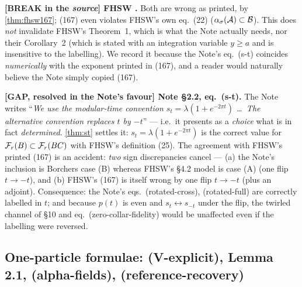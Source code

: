 \documentclass[11pt]{article}
\renewcommand{\cB}{\mathcal B}
\begin{document}
\begin{verdictbreak}
\textbf{[BREAK in the \emph{source}] FHSW \cite[\S4.2, eq.~(167) and the
definition sentence]{FHSW}.} Both are wrong as printed, by
\cref{thm:fhsw167}; (167) even violates FHSW's own eq.~(22)
($\alpha_\sigma(\cA)\subset\cB$). This does \emph{not} invalidate FHSW's
Theorem~1, which is what the Note actually needs, nor their Corollary~2 (which
is stated with an integration variable $y\ge a$ and is insensitive to the
labelling). We record it because the Note's eq.~(s-t) coincides
\emph{numerically} with the exponent printed in (167), and a reader would
naturally believe the Note simply copied (167).
\end{verdictbreak}

\begin{verdictgap}
\textbf{[GAP, resolved in the Note's favour] Note \S2.2, eq.~(s-t).} The Note
writes ``\emph{We use the modular-time convention $s_t=\lambda(1+e^{-2\pi t})$
\dots\ The alternative convention replaces $t$ by $-t$}'' --- i.e.\ it presents
as a \emph{choice} what is in fact \emph{determined}. \cref{thm:st} settles it:
$s_t=\lambda(1+e^{-2\pi t})$ is the correct value for
$\mathcal F_r(B)\subset\mathcal F_r(BC)$ with FHSW's definition (25). The agreement with
FHSW's printed (167) is an accident: \emph{two} sign discrepancies cancel ---
(a) the Note's inclusion is Borchers case (B) whereas FHSW's \S4.2 model is
case (A) (one flip $t\to-t$), and (b) FHSW's (167) is itself wrong by one flip
$t\to-t$ (plus an adjoint). Consequence: the Note's eqs.~(rotated-cross),
(rotated-full) are correctly labelled in $t$; and because $p(t)$ is even and
$s_t\leftrightarrow s_{-t}$ under the flip, the twirled channel of \S10 and
eq.~(zero-collar-fidelity) would be unaffected even if the labelling were
reversed.
\end{verdictgap}

\subsection{One-particle formulae: (V-explicit), Lemma 2.1, (alpha-fields), (reference-recovery)}
\end{document}
